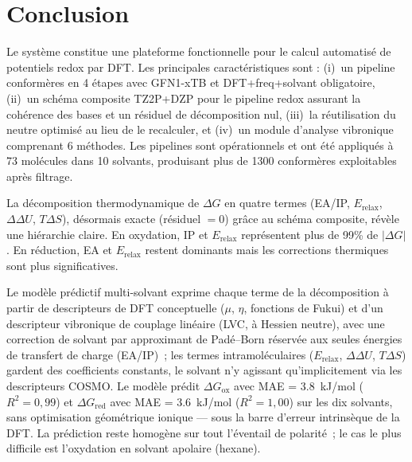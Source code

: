\section{Conclusion}

Le système constitue une plateforme fonctionnelle pour le calcul automatisé de potentiels redox par DFT. Les principales caractéristiques sont : (i)~un pipeline conformères en 4 étapes avec GFN1-xTB et DFT+freq+solvant obligatoire, (ii)~un schéma composite TZ2P+DZP pour le pipeline redox assurant la cohérence des bases et un résiduel de décomposition nul, (iii)~la réutilisation du neutre optimisé au lieu de le recalculer, et (iv)~un module d'analyse vibronique comprenant 6 méthodes. Les pipelines sont opérationnels et ont été appliqués à 73 molécules dans 10 solvants, produisant plus de 1300 conformères exploitables après filtrage.

La décomposition thermodynamique de $\Delta G$ en quatre termes (EA/IP, $E_\text{relax}$, $\Delta\Delta U$, $T\Delta S$), désormais exacte (résiduel $= 0$) grâce au schéma composite, révèle une hiérarchie claire. En oxydation, IP et $E_\text{relax}$ représentent plus de 99\% de $|\Delta G|$. En réduction, EA et $E_\text{relax}$ restent dominants mais les corrections thermiques sont plus significatives.

Le modèle prédictif multi-solvant exprime chaque terme de la décomposition à partir de descripteurs de DFT conceptuelle ($\mu$, $\eta$, fonctions de Fukui) et d'un descripteur vibronique de couplage linéaire (LVC, à Hessien neutre), avec une correction de solvant par approximant de Padé--Born réservée aux seules énergies de transfert de charge (EA/IP)~; les termes intramoléculaires ($E_\text{relax}$, $\Delta\Delta U$, $T\Delta S$) gardent des coefficients constants, le solvant n'y agissant qu'implicitement via les descripteurs COSMO. Le modèle prédit $\Delta G_\text{ox}$ avec MAE = \SI{3.8}{kJ/mol} ($R^2 = 0{,}99$) et $\Delta G_\text{red}$ avec MAE = \SI{3.6}{kJ/mol} ($R^2 = 1{,}00$) sur les dix solvants, sans optimisation géométrique ionique --- sous la barre d'erreur intrinsèque de la DFT. La prédiction reste homogène sur tout l'éventail de polarité~; le cas le plus difficile est l'oxydation en solvant apolaire (hexane).

